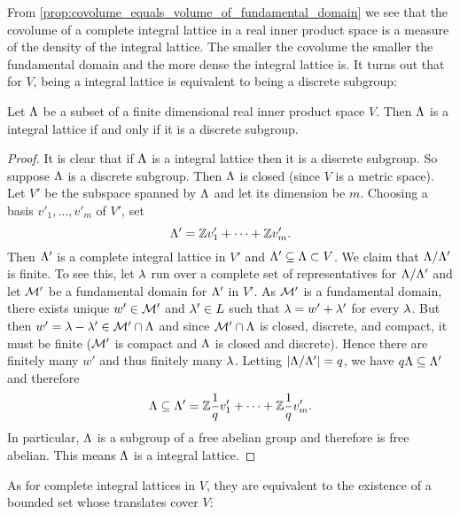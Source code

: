     From \cref{prop:covolume_equals_volume_of_fundamental_domain} we see that the covolume of a complete integral lattice in a real inner product space is a measure of the density of the integral lattice. The smaller the covolume the smaller the fundamental domain and the more dense the integral lattice is. It turns out that for $V$, being a integral lattice is equivalent to being a discrete subgroup:

    \begin{proposition}\label{prop:integral lattice_if_and_only_if_discrete_subgroup}
      Let $\Lambda$ be a subset of a finite dimensional real inner product space $V$. Then $\Lambda$ is a integral lattice if and only if it is a discrete subgroup.
    \end{proposition}
    \begin{proof}
      It is clear that if $\Lambda$ is a integral lattice then it is a discrete subgroup. So suppose $\Lambda$ is a discrete subgroup. Then $\Lambda$ is closed (since $V$ is a metric space). Let $V'$ be the subspace spanned by $\Lambda$ and let its dimension be $m$. Choosing a basis $v'_{1},\ldots,v'_{m}$ of $V'$, set
      \[
        \Lambda' = \mathbb{Z} v'_{1}+\cdots+\mathbb{Z} v'_{m}.
      \]
      Then $\Lambda'$ is a complete integral lattice in $V'$ and $\Lambda' \subseteq \Lambda \subset V$. We claim that $\Lambda/\Lambda'$ is finite. To see this, let $\lambda$ run over a complete set of representatives for $\Lambda/\Lambda'$ and let $\mathcal{M}'$ be a fundamental domain for $\Lambda'$ in $V'$. As $\mathcal{M}'$ is a fundamental domain, there exists unique $w' \in \mathcal{M}'$ and $\lambda' \in L$ such that $\lambda = w'+\lambda'$ for every $\lambda$. But then $w' = \lambda-\lambda' \in \mathcal{M}' \cap \Lambda$ and since $\mathcal{M}' \cap \Lambda$ is closed, discrete, and compact, it must be finite ($\mathcal{M}'$ is compact and $\Lambda$ is closed and discrete). Hence there are finitely many $w'$ and thus finitely many $\lambda$. Letting $|\Lambda/\Lambda'| = q$, we have $q\Lambda \subseteq \Lambda'$ and therefore
      \[
        \Lambda \subseteq \Lambda' = \mathbb{Z}\frac{1}{q}v'_{1}+\cdots+\mathbb{Z}\frac{1}{q}v'_{m}.
      \]
      In particular, $\Lambda$ is a subgroup of a free abelian group and therefore is free abelian. This means $\Lambda$ is a integral lattice.
    \end{proof}

    As for complete integral lattices in $V$, they are equivalent to the existence of a bounded set whose translates cover $V$:

